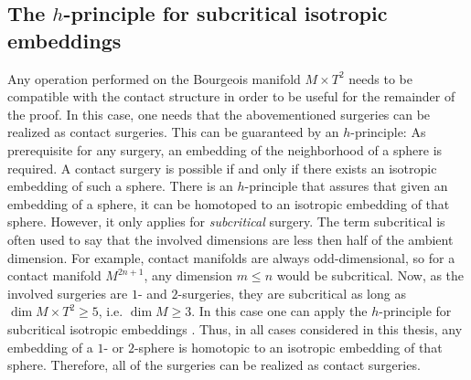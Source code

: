 \subsection{The $h$-principle for subcritical isotropic embeddings}
Any operation performed on the Bourgeois manifold $M\times T^2$ needs to be compatible with the contact structure
in order to be useful for the remainder of the proof.
In this case, one needs that the abovementioned surgeries can be realized as contact surgeries.
This can be guaranteed by an $h$-principle:
As prerequisite for any surgery, an embedding of the neighborhood of a sphere is required. 
A contact surgery is possible if and only if there exists an isotropic embedding of such a sphere.
There is an $h$-principle that assures that given an embedding of a sphere, it can be homotoped to an isotropic embedding of that sphere.
However, it only applies for \textit{subcritical} surgery.
The term subcritical is often used to say that the involved dimensions are less then half of the ambient dimension.
For example, contact manifolds are always odd-dimensional, so for a contact manifold $M^{2n+1}$, any dimension $m \leq n$ would be subcritical.
Now, as the involved surgeries are $1$- and $2$-surgeries, they are subcritical as long as $\dim M\times T^2 \geq 5$, i.e. $\dim M \geq 3$.
In this case one can apply the $h$-principle for subcritical isotropic embeddings \cite[12.4.1]{EM02}.
Thus, in all cases considered in this thesis, any embedding of a $1$- or $2$-sphere is homotopic to an isotropic embedding of that sphere.
Therefore, all of the surgeries can be realized as contact surgeries.